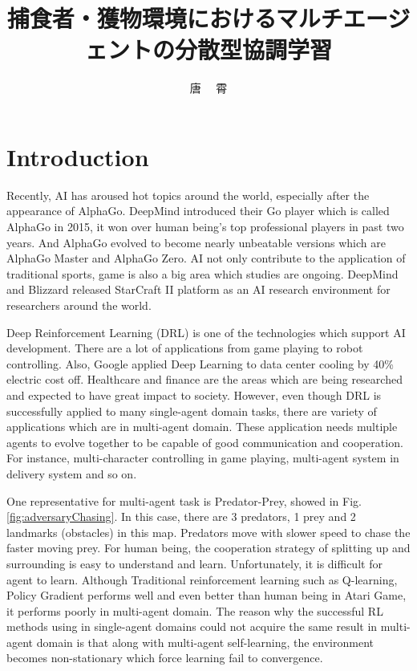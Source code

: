 \documentclass[11pt,twocolumn]{jarticle} %
\title{捕食者・獲物環境におけるマルチエージェントの分散型協調学習}
\author{唐 \ \ 霄}
\begin{document}
\maketitle
\thispagestyle{iitheader}
\section{Introduction}
Recently, AI has aroused hot topics around the world, especially after the appearance of AlphaGo\cite{alphago}. DeepMind introduced their Go player which is called AlphaGo in 2015, it won over human being's top professional players in past two years. And AlphaGo evolved to become nearly unbeatable versions which are AlphaGo Master and AlphaGo Zero\cite{alphagozero}. AI not only contribute to the application of traditional sports, game is also a big area which studies are ongoing. DeepMind and Blizzard released StarCraft II platform as an AI research environment\cite{starcraft} for researchers around the world.\par

Deep Reinforcement Learning (DRL) is one of the technologies which support AI development. There are a lot of applications from game playing\cite{game} to robot controlling\cite{robot}. Also, Google applied Deep Learning to data center cooling by 40\%\cite{google} electric cost off. Healthcare and finance\cite{finance} are the areas which are being researched and expected to have great impact to society. However, even though DRL is successfully applied to many single-agent domain tasks, there are variety of applications which are in multi-agent domain. These application needs multiple agents to evolve together to be capable of good communication and cooperation. For instance, multi-character controlling in game playing, multi-agent system in delivery system and so on.

One representative for multi-agent task is Predator-Prey\cite{maddpg}, showed in Fig. \ref{fig:adversaryChasing}. In this case, there are 3 predators, 1 prey and 2 landmarks (obstacles) in this map. Predators move with slower speed to chase the faster moving prey. For human being, the cooperation strategy of splitting up and surrounding is easy to understand and learn. Unfortunately, it is difficult for agent to learn. Although Traditional reinforcement learning such as Q-learning\cite{qlearning}, Policy Gradient\cite{pg} performs well and even better than human being in Atari Game\cite{ddpg}, it performs poorly in multi-agent domain. The reason why the successful RL methods using in single-agent domains could not acquire the same result in multi-agent domain is that along with multi-agent self-learning, the environment becomes non-stationary which force learning fail to convergence. \par
\end{document}
